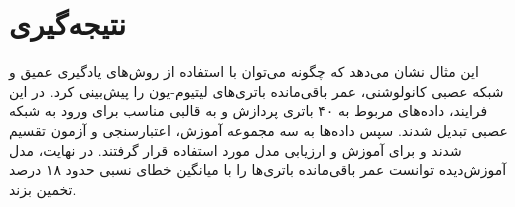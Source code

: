 \section{نتیجه‌گیری}

این مثال نشان می‌دهد که چگونه می‌توان با استفاده از روش‌های یادگیری عمیق و شبکه عصبی کانولوشنی، عمر باقی‌مانده باتری‌های لیتیوم-یون را پیش‌بینی کرد. در این فرایند، داده‌های مربوط به ۴۰ باتری پردازش و به قالبی مناسب برای ورود به شبکه عصبی تبدیل شدند. سپس داده‌ها به سه مجموعه آموزش، اعتبارسنجی و آزمون تقسیم شدند و برای آموزش و ارزیابی مدل مورد استفاده قرار گرفتند. در نهایت، مدل آموزش‌دیده توانست عمر باقی‌مانده باتری‌ها را با میانگین خطای نسبی حدود ۱۸ درصد تخمین بزند.

